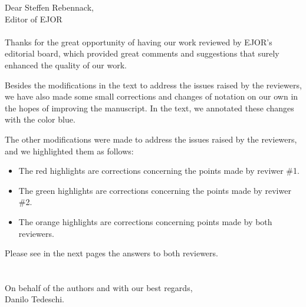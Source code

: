 \documentclass{report}
\begin{document}
	
			
			\noindent Dear Steffen Rebennack,\\ Editor of EJOR
			\\
			\\
			
			Thanks for the great opportunity of having our work reviewed by EJOR's editorial board, which provided great comments and suggestions that surely enhanced the quality of our work. 
			
			Besides the modifications in the text to address the issues raised by the reviewers, we have also made some small corrections and changes of notation on our own in the hopes of improving the manuscript. In the text, we annotated these changes with the color {\color{blue}blue}.
			
			The other modifications were made to address the issues raised by the reviewers, and we highlighted them as follows:
			
			\begin{itemize}
				\item The {\color{Red} red} highlights are corrections concerning the points made by reviwer \#1.
				
				\item The {\color{Green} green} highlights are corrections concerning the points made by reviwer \#2.
				
				\item The {\color{Orange} orange} highlights are corrections concerning points made by both reviewers.
			\end{itemize}
			
			Please see in the next pages the answers to both reviewers.
			\\
			\\
			\\
			On behalf of the authors and with our best regards,\\
			Danilo Tedeschi.
\clearpage
	
	
	\clearpage
	
	
\end{document}
